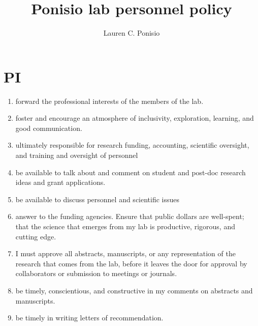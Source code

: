 \documentclass[12pt]{article}
\title{Ponisio lab personnel policy}
\author{Lauren C. Ponisio}
\begin{document}
\maketitle

\section{PI}
\begin{enumerate}
\item forward the professional interests of the members of the lab.
\item foster and encourage an atmosphere of inclusivity, exploration,
  learning, and good communication.
\item ultimately responsible for research funding, accounting,
  scientific oversight, and training and oversight of personnel
\item be available to talk about and comment on student and post-doc
  research ideas and grant applications.
\item be available to discuss personnel and scientific issues
\item answer to the funding agencies. Ensure that public dollars are
  well-spent; that the science that emerges from my lab is productive,
  rigorous, and cutting edge.
\item I must approve all abstracts, manuscripts, or any representation
  of the research that comes from the lab, before it leaves the door
  for approval by collaborators or submission to meetings or journals.
\item be timely, conscientious, and constructive in my comments on
  abstracts and manuscripts.
\item be timely in writing letters of recommendation.
\end{enumerate}
\end{document}

